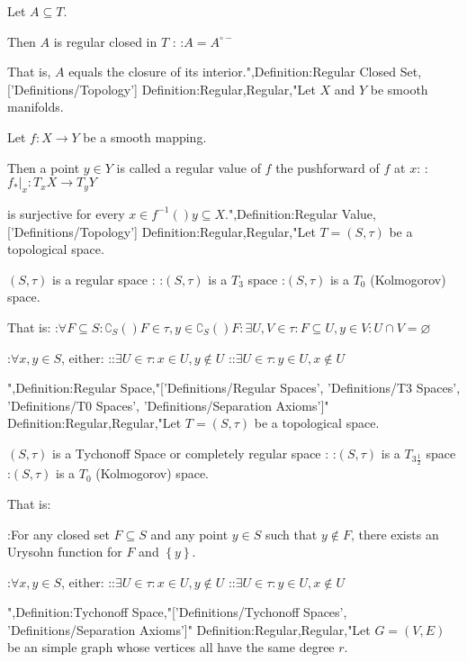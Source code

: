 Let $A \subseteq T$.


Then $A$ is regular closed in $T$ :
:$A = A^{\circ -}$

That is,  $A$ equals the closure of its interior.",Definition:Regular Closed Set,['Definitions/Topology']
Definition:Regular,Regular,"Let $X$ and $Y$ be smooth manifolds.

Let $f: X \to Y$ be a smooth mapping.


Then a point $y \in Y$ is called a regular value of $f$  the pushforward of $f$ at $x$:
: $f_* \vert_x: T_x X \to T_y Y$

is surjective for every $x \in f^{-1}  \left(   \right)y \subseteq X$.",Definition:Regular Value,['Definitions/Topology']
Definition:Regular,Regular,"Let $T = \left( S, \tau \right)$ be a topological space.


$\left( S, \tau \right)$ is a regular space :
:$\left( S, \tau \right)$ is a $T_3$ space
:$\left( S, \tau \right)$ is a $T_0$ (Kolmogorov) space.


That is:
:$\forall F \subseteq S: \complement_{S} \left(   \right)F \in \tau, y \in \complement_{S} \left(   \right)F: \exists U, V \in \tau: F \subseteq U, y \in V: U \cap V = \varnothing$ 

:$\forall x, y \in S$, either:
::$\exists U \in \tau: x \in U, y \notin U$
::$\exists U \in \tau: y \in U, x \notin U$


",Definition:Regular Space,"['Definitions/Regular Spaces', 'Definitions/T3 Spaces', 'Definitions/T0 Spaces', 'Definitions/Separation Axioms']"
Definition:Regular,Regular,"Let $T = \left( S, \tau \right)$ be a topological space.


$\left( S, \tau \right)$ is a Tychonoff Space or completely regular space :
:$\left( S, \tau \right)$ is a $T_{3 \frac 1 2}$ space
:$\left( S, \tau \right)$ is a $T_0$ (Kolmogorov) space.


That is:

:For any closed set $F \subseteq S$ and any point $y \in S$ such that $y \notin F$, there exists an Urysohn function for $F$ and $\left\lbrace y \right\rbrace$.

:$\forall x, y \in S$, either:
::$\exists U \in \tau: x \in U, y \notin U$
::$\exists U \in \tau: y \in U, x \notin U$


",Definition:Tychonoff Space,"['Definitions/Tychonoff Spaces', 'Definitions/Separation Axioms']"
Definition:Regular,Regular,"Let $G = \left( V, E \right)$ be an simple graph whose vertices all have the same degree $r$.

